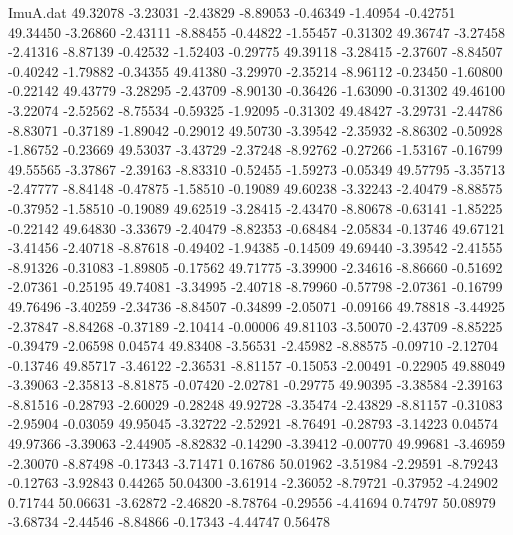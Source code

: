 \begin{filecontents}{ImuA.dat}
  49.32078   -3.23031   -2.43829   -8.89053   -0.46349   -1.40954   -0.42751
  49.34450   -3.26860   -2.43111   -8.88455   -0.44822   -1.55457   -0.31302
  49.36747   -3.27458   -2.41316   -8.87139   -0.42532   -1.52403   -0.29775
  49.39118   -3.28415   -2.37607   -8.84507   -0.40242   -1.79882   -0.34355
  49.41380   -3.29970   -2.35214   -8.96112   -0.23450   -1.60800   -0.22142
  49.43779   -3.28295   -2.43709   -8.90130   -0.36426   -1.63090   -0.31302
  49.46100   -3.22074   -2.52562   -8.75534   -0.59325   -1.92095   -0.31302
  49.48427   -3.29731   -2.44786   -8.83071   -0.37189   -1.89042   -0.29012
  49.50730   -3.39542   -2.35932   -8.86302   -0.50928   -1.86752   -0.23669
  49.53037   -3.43729   -2.37248   -8.92762   -0.27266   -1.53167   -0.16799
  49.55565   -3.37867   -2.39163   -8.83310   -0.52455   -1.59273   -0.05349
  49.57795   -3.35713   -2.47777   -8.84148   -0.47875   -1.58510   -0.19089
  49.60238   -3.32243   -2.40479   -8.88575   -0.37952   -1.58510   -0.19089
  49.62519   -3.28415   -2.43470   -8.80678   -0.63141   -1.85225   -0.22142
  49.64830   -3.33679   -2.40479   -8.82353   -0.68484   -2.05834   -0.13746
  49.67121   -3.41456   -2.40718   -8.87618   -0.49402   -1.94385   -0.14509
  49.69440   -3.39542   -2.41555   -8.91326   -0.31083   -1.89805   -0.17562
  49.71775   -3.39900   -2.34616   -8.86660   -0.51692   -2.07361   -0.25195
  49.74081   -3.34995   -2.40718   -8.79960   -0.57798   -2.07361   -0.16799
  49.76496   -3.40259   -2.34736   -8.84507   -0.34899   -2.05071   -0.09166
  49.78818   -3.44925   -2.37847   -8.84268   -0.37189   -2.10414   -0.00006
  49.81103   -3.50070   -2.43709   -8.85225   -0.39479   -2.06598    0.04574
  49.83408   -3.56531   -2.45982   -8.88575   -0.09710   -2.12704   -0.13746
  49.85717   -3.46122   -2.36531   -8.81157   -0.15053   -2.00491   -0.22905
  49.88049   -3.39063   -2.35813   -8.81875   -0.07420   -2.02781   -0.29775
  49.90395   -3.38584   -2.39163   -8.81516   -0.28793   -2.60029   -0.28248
  49.92728   -3.35474   -2.43829   -8.81157   -0.31083   -2.95904   -0.03059
  49.95045   -3.32722   -2.52921   -8.76491   -0.28793   -3.14223    0.04574
  49.97366   -3.39063   -2.44905   -8.82832   -0.14290   -3.39412   -0.00770
  49.99681   -3.46959   -2.30070   -8.87498   -0.17343   -3.71471    0.16786
  50.01962   -3.51984   -2.29591   -8.79243   -0.12763   -3.92843    0.44265
  50.04300   -3.61914   -2.36052   -8.79721   -0.37952   -4.24902    0.71744
  50.06631   -3.62872   -2.46820   -8.78764   -0.29556   -4.41694    0.74797
  50.08979   -3.68734   -2.44546   -8.84866   -0.17343   -4.44747    0.56478

\end{filecontents}
